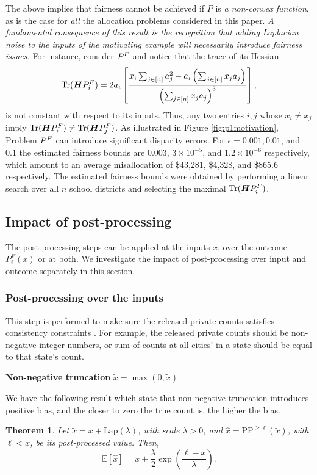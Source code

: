 \documentclass[9pt,lineno,twocolumn,twoside]{pnas-new}
\newcommand{\EE}{\mathbb{E}} \newcommand{\RR}{\mathbb{R}}
\newtheorem{theorem}{Theorem}
\begin{document}
    \noindent
    The above implies that fairness cannot be achieved if $P$ is \emph{a
    non-convex function}, as is the case for \emph{all} the allocation
    problems considered in this paper. {\em A fundamental consequence of
    this result is the recognition that adding Laplacian noise to the
    inputs of the motivating example will necessarily introduce fairness
    issues.} For instance, consider $P^F$ and notice that the trace of
    its Hessian
    \[
        \mbox{Tr}(\bm{H}P^F_i) = 2a_i \left[
            \frac{x_i \sum_{j\in[n]} a_j^2 - a_i \left(\sum_{j\in[n]} x_ja_j\right)}
            {\left(\sum_{j\in[n]}x_ja_j\right)^3}
            \right],
    \]
    is not constant with respect to its inputs. Thus, any two entries $i,
    j$ whose $x_i \neq x_j$ imply $\mbox{Tr}(\bm{H}P^F_i) \neq
    \mbox{Tr}(\bm{H}P^F_j)$. As illustrated in Figure \ref{fig:p1motivation},
    Problem $P^F$ can introduce significant disparity errors. For $\epsilon = 0.001,
    0.01$, and $0.1$ the estimated fairness bounds are $0.003$, $3\times
    10^{-5}$, and $1.2\times 10^{-6}$ respectively, which amount to an
    average misallocation of \$43,281, \$4,328, and \$865.6 respectively.
    The estimated fairness bounds were obtained by performing a linear
    search over all $n$ school districts and selecting the maximal
    $\mbox{Tr}(\bm{H}P^F_i)$.


    \subsection*{Impact of post-processing}
    The post-processing steps can be applied at the inputs $x$, over the outcome $P^F_{i}(x)$ or at both. We investigate the impact of post-processing over input and outcome separately in this section.


    \subsubsection*{Post-processing over the inputs}
    This step is performed to make sure the released private counts satisfies consistency constraints \cite{cohen2021census}. For example, the released private counts should be non-negative integer numbers, or sum of counts at all cities' in a state should be equal to that state's count.


    \noindent \textbf{Non-negative truncation} $\tilde{x} = \max(0, \tilde{x}) $

    We have the following result which state that non-negative truncation introduces positive bias, and the closer to zero the true count is, the higher the bias.
    \begin{theorem}
        \label{lem:exp_clipped_lap}
        Let $\tilde{x} = x + \mbox{Lap}(\lambda)$, with scale $\lambda > 0$,
        and $\hat{x} = \text{PP}^{\geq \ell}(\tilde{x})$, with $\ell < x$,
        be its post-processed value. Then,
        $$
        \EE[\hat{x}] = x + \frac{\lambda}{2} \exp(\frac{\ell - x}{\lambda} ).
        $$
    \end{theorem}
\end{document}
